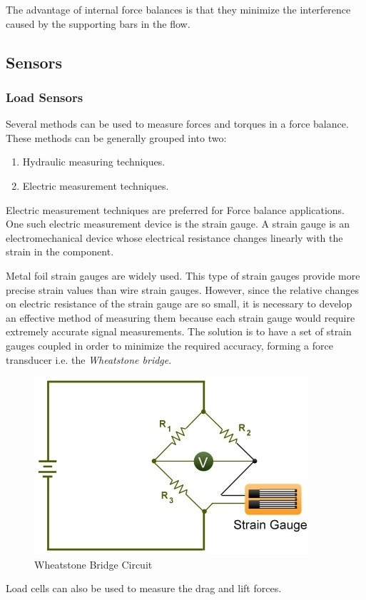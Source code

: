 The advantage of internal force balances is that they minimize the interference caused by the supporting bars in the flow.
\subsection{Sensors}
\subsubsection{Load Sensors}
Several methods can be used to measure forces and torques in a force balance. These methods can be generally grouped into two\cite{ferreira2015design}:
\begin{enumerate}
\item Hydraulic measuring techniques.
\item Electric measurement techniques.
\end{enumerate}
Electric measurement techniques are preferred for Force balance applications. One such electric measurement device is the strain gauge. A strain gauge is an electromechanical device whose electrical resistance changes linearly with the strain in the component.

Metal foil strain gauges are widely used. This type of strain gauges provide more precise strain values than wire strain gauges. However, since the relative changes on electric resistance of the strain gauge are so small, it is necessary to develop an effective method of measuring them because each strain gauge would require extremely accurate signal measurements. The solution is to have a set of strain gauges coupled in order to minimize the required accuracy, forming a force transducer i.e. the \textit{Wheatstone bridge}.
\begin{center}
		\begin{figure}[H]
		\centering
		\includegraphics[width=0.6\linewidth]{Figures/Fig9}
		\caption[Wheatstone Bridge Circuit]{Wheatstone Bridge Circuit \cite{ferreira2015design}}
		\end{figure}
\end{center}
Load cells can also be used to measure the drag and lift forces\cite{ferreira2015design}.
